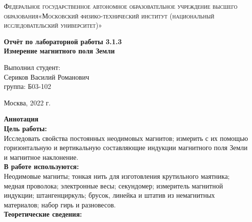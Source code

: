 \documentclass[a4paper, 12pt]{article}%
\begin{document}
	\begin{titlepage}
		\begin{center}
			\textsc{Федеральное государственное автономное образовательное учреждение высшего образования«Московский физико-технический институт (национальный исследовательский университет)»\\[5mm]
			}
			
			\vfill
			
			\textbf{Отчёт по лабораторной работы 3.1.3\\[3mm]
				Измерение магнитного поля Земли
				\\[50mm]
			}
			
		\end{center}
		
		\hfill
		\begin{minipage}{.5\textwidth}
			Выполнил студент:\\[2mm]
			Сериков Василий Романович\\[2mm]
			группа: Б03-102\\[5mm]
			
		\end{minipage}
		\vfill
		\begin{center}
			Москва, 2022 г.
		\end{center}
		
	\end{titlepage}
	
	\newpage
	\textbf{Аннотация}\\
	
	
	\textbf{Цель работы: }\\
	
	Исследовать свойства постоянных неодимовых магнитов;
	измерить с их помощью горизонтальную и вертикальную составляющие
	индукции магнитного поля Земли и магнитное наклонение.\\
	
	\textbf{В работе используются: }\\
	
	Неодимовые магниты; тонкая нить для изготовления крутильного маятника; медная проволока; электронные весы; секундомер; измеритель магнитной индукции; штангенциркуль; брусок, линейка
	и штатив из немагнитных материалов; набор гирь и разновесов.\\
	
	\textbf{Теоретические сведения: } \\
	
\end{document}

